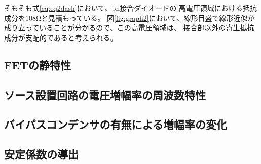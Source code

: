\documentclass[11pt,a4paper]{ltjsarticle}
\begin{document}
そもそも式\ref{eq:eq2dash}において、pn接合ダイオードの
高電圧領域における抵抗成分を$108 \si{\ohm}$と見積もっている。
図\ref{fig:graph2}において、線形目盛で線形近似が
成り立っていることが分かるので、この高電圧領域は、
接合部以外の寄生抵抗成分が支配的であると考えられる。

\subsection{FETの静特性}

\subsection{ソース設置回路の電圧増幅率の周波数特性}

\subsection{バイパスコンデンサの有無による増幅率の変化}

\subsection{安定係数の導出}




\end{document}
